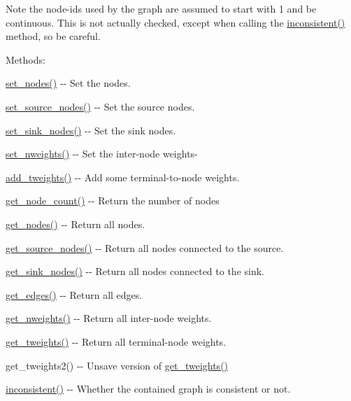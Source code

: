 \begin{DoxyNote}{Note}
the node-\/ids used by the graph are assumed to start with 1 and be continuous. This is not actually checked, except when calling the \hyperlink{classmedpy_1_1graphcut_1_1graph_1_1Graph_a0fbe2b59f746e726f8bcf6c3111d7860}{inconsistent()} method, so be careful.
\end{DoxyNote}
Methods:
\begin{DoxyItemize}
\item \hyperlink{classmedpy_1_1graphcut_1_1graph_1_1Graph_a41b5d54706b84e5a11523da1ba626848}{set\_\-nodes()} -\/-\/ Set the nodes.
\item \hyperlink{classmedpy_1_1graphcut_1_1graph_1_1Graph_af1726ca138ac2522b5fe98f5ae5b157f}{set\_\-source\_\-nodes()} -\/-\/ Set the source nodes.
\item \hyperlink{classmedpy_1_1graphcut_1_1graph_1_1Graph_a54b1a1643e1eedda40c121f9b3e7577d}{set\_\-sink\_\-nodes()} -\/-\/ Set the sink nodes.
\item \hyperlink{classmedpy_1_1graphcut_1_1graph_1_1Graph_a197d5cca5684cebfbabb07f13c4c0175}{set\_\-nweights()} -\/-\/ Set the inter-\/node weights-\/
\item \hyperlink{classmedpy_1_1graphcut_1_1graph_1_1Graph_a5a99c76efac37bc31acf495873933122}{add\_\-tweights()} -\/-\/ Add some terminal-\/to-\/node weights.
\item \hyperlink{classmedpy_1_1graphcut_1_1graph_1_1Graph_a146e523cb0c30515b5d3a765205461da}{get\_\-node\_\-count()} -\/-\/ Return the number of nodes
\item \hyperlink{classmedpy_1_1graphcut_1_1graph_1_1Graph_a1cf8f8077a620ae6fd90b327f689d5e5}{get\_\-nodes()} -\/-\/ Return all nodes.
\item \hyperlink{classmedpy_1_1graphcut_1_1graph_1_1Graph_a4c8dbbd92c6b0e5534869890810f0c78}{get\_\-source\_\-nodes()} -\/-\/ Return all nodes connected to the source.
\item \hyperlink{classmedpy_1_1graphcut_1_1graph_1_1Graph_a988309a34486d834c65d87e83548b969}{get\_\-sink\_\-nodes()} -\/-\/ Return all nodes connected to the sink.
\item \hyperlink{classmedpy_1_1graphcut_1_1graph_1_1Graph_aabbf310726d5af9bbd79c6492f683c11}{get\_\-edges()} -\/-\/ Return all edges.
\item \hyperlink{classmedpy_1_1graphcut_1_1graph_1_1Graph_a1090dadcdad71f1d629425c917e32ba5}{get\_\-nweights()} -\/-\/ Return all inter-\/node weights.
\item \hyperlink{classmedpy_1_1graphcut_1_1graph_1_1Graph_a4b033a8067128c8a222f6c466f1b606f}{get\_\-tweights()} -\/-\/ Return all terminal-\/node weights.
\item get\_\-tweights2() -\/-\/ Unsave version of \hyperlink{classmedpy_1_1graphcut_1_1graph_1_1Graph_a4b033a8067128c8a222f6c466f1b606f}{get\_\-tweights()}
\item \hyperlink{classmedpy_1_1graphcut_1_1graph_1_1Graph_a0fbe2b59f746e726f8bcf6c3111d7860}{inconsistent()} -\/-\/ Whether the contained graph is consistent or not. 
\end{DoxyItemize}

